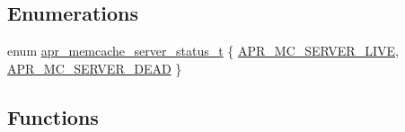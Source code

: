 \subsection*{Enumerations}
\begin{DoxyCompactItemize}
\item 
enum \hyperlink{group___a_p_r___util___m_c_ga3b18c7c3f0ecabb930b78aa549c2e2e8}{apr\-\_\-memcache\-\_\-server\-\_\-status\-\_\-t} \{ \hyperlink{group___a_p_r___util___m_c_gga3b18c7c3f0ecabb930b78aa549c2e2e8a211c8d3d7a4a187b5c8f936a6929d007}{A\-P\-R\-\_\-\-M\-C\-\_\-\-S\-E\-R\-V\-E\-R\-\_\-\-L\-I\-V\-E}, 
\hyperlink{group___a_p_r___util___m_c_gga3b18c7c3f0ecabb930b78aa549c2e2e8a6dffa918006f926e0fdf0074f4bdac28}{A\-P\-R\-\_\-\-M\-C\-\_\-\-S\-E\-R\-V\-E\-R\-\_\-\-D\-E\-A\-D}
 \}
\end{DoxyCompactItemize}
\subsection*{Functions}
